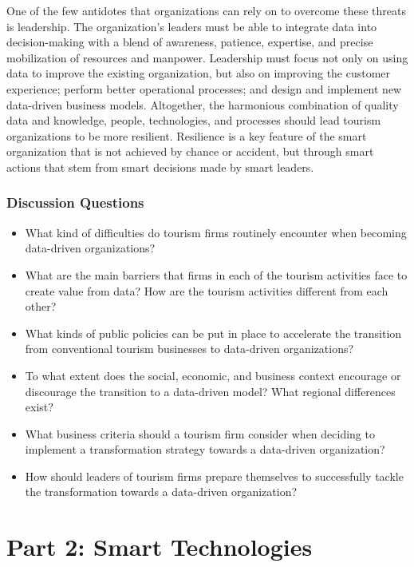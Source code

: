 \documentclass[
  letterpaper,
  DIV=11,
  numbers=noendperiod]{scrreprt}
\begin{document}
One of the few antidotes that organizations can rely on to overcome
these threats is leadership. The organization's leaders must be able to
integrate data into decision-making with a blend of awareness, patience,
expertise, and precise mobilization of resources and manpower.
Leadership must focus not only on using data to improve the existing
organization, but also on improving the customer experience; perform
better operational processes; and design and implement new data-driven
business models. Altogether, the harmonious combination of quality data
and knowledge, people, technologies, and processes should lead tourism
organizations to be more resilient. Resilience is a key feature of the
smart organization that is not achieved by chance or accident, but
through smart actions that stem from smart decisions made by smart
leaders.

\hypertarget{discussion-questions-3}{%
\section{Discussion Questions}\label{discussion-questions-3}}

\begin{itemize}
\item
  What kind of difficulties do tourism firms routinely encounter when
  becoming data-driven organizations?
\item
  What are the main barriers that firms in each of the tourism
  activities face to create value from data? How are the tourism
  activities different from each other?
\item
  What kinds of public policies can be put in place to accelerate the
  transition from conventional tourism businesses to data-driven
  organizations?
\item
  To what extent does the social, economic, and business context
  encourage or discourage the transition to a data-driven model? What
  regional differences exist?
\item
  What business criteria should a tourism firm consider when deciding to
  implement a transformation strategy towards a data-driven
  organization?
\item
  How should leaders of tourism firms prepare themselves to successfully
  tackle the transformation towards a data-driven organization?
\end{itemize}

\part{Part 2: Smart Technologies}
\end{document}
